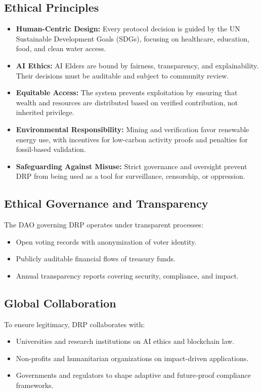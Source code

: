 \documentclass[11pt,a4paper]{article}
\begin{document}
\subsection{Ethical Principles}
\begin{itemize}
    \item \textbf{Human-Centric Design:}  
    Every protocol decision is guided by the UN Sustainable Development Goals (SDGs), focusing on healthcare, education, food, and clean water access.  

    \item \textbf{AI Ethics:}  
    AI Elders are bound by fairness, transparency, and explainability. Their decisions must be auditable and subject to community review.  

    \item \textbf{Equitable Access:}  
    The system prevents exploitation by ensuring that wealth and resources are distributed based on verified contribution, not inherited privilege.  

    \item \textbf{Environmental Responsibility:}  
    Mining and verification favor renewable energy use, with incentives for low-carbon activity proofs and penalties for fossil-based validation.  

    \item \textbf{Safeguarding Against Misuse:}  
    Strict governance and oversight prevent DRP from being used as a tool for surveillance, censorship, or oppression.  
\end{itemize}

\subsection{Ethical Governance and Transparency}
The DAO governing DRP operates under transparent processes:
\begin{itemize}
    \item Open voting records with anonymization of voter identity.  
    \item Publicly auditable financial flows of treasury funds.  
    \item Annual transparency reports covering security, compliance, and impact.  
\end{itemize}

\subsection{Global Collaboration}
To ensure legitimacy, DRP collaborates with:
\begin{itemize}
    \item Universities and research institutions on AI ethics and blockchain law.  
    \item Non-profits and humanitarian organizations on impact-driven applications.  
    \item Governments and regulators to shape adaptive and future-proof compliance frameworks.  
\end{itemize}
\end{document}
